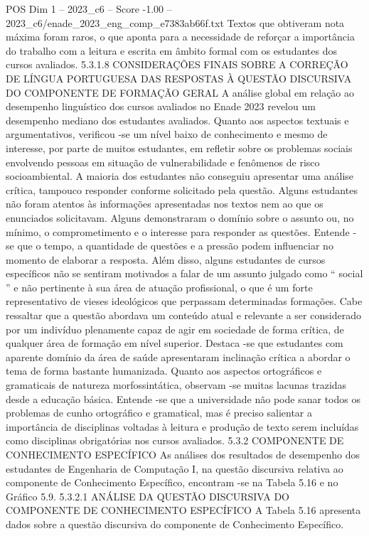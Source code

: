 \begin{textsample}{POS Dim 1 – 2023\_c6 – Score -1.00 – 2023\_c6/enade\_2023\_eng\_comp\_e7383ab66f.txt}
Textos que obtiveram nota máxima foram raros, o que aponta para a necessidade de reforçar a importância do trabalho com a leitura e escrita em âmbito formal com os estudantes dos cursos avaliados. 5.3.1.8 CONSIDERAÇÕES FINAIS SOBRE A CORREÇÃO DE LÍNGUA PORTUGUESA DAS RESPOSTAS À QUESTÃO DISCURSIVA DO COMPONENTE DE FORMAÇÃO GERAL A análise global em relação ao desempenho linguístico dos cursos avaliados no Enade 2023 revelou um desempenho mediano dos estudantes avaliados.
Quanto aos aspectos textuais e argumentativos, verificou -se um nível baixo de conhecimento e mesmo de interesse, por parte de muitos estudantes, em refletir sobre os problemas sociais envolvendo pessoas em situação de vulnerabilidade e fenômenos de risco socioambiental.
A maioria dos estudantes não conseguiu apresentar uma análise crítica, tampouco responder conforme solicitado pela questão.
Alguns estudantes não foram atentos às informações apresentadas nos textos nem ao que os enunciados solicitavam.
Alguns demonstraram o domínio sobre o assunto ou, no mínimo, o comprometimento e o interesse para responder as questões.
Entende -se que o tempo, a quantidade de questões e a pressão podem influenciar no momento de elaborar a resposta.
Além disso, alguns estudantes de cursos específicos não se sentiram motivados a falar de um assunto julgado como “ social ” e não pertinente à sua área de atuação profissional, o que é um forte representativo de vieses ideológicos que perpassam determinadas formações.
Cabe ressaltar que a questão abordava um conteúdo atual e relevante a ser considerado por um indivíduo plenamente capaz de agir em sociedade de forma crítica, de qualquer área de formação em nível superior.
Destaca -se que estudantes com aparente domínio da área de saúde apresentaram inclinação crítica a abordar o tema de forma bastante humanizada.
Quanto aos aspectos ortográficos e gramaticais de natureza morfossintática, observam -se muitas lacunas trazidas desde a educação básica.
Entende -se que a universidade não pode sanar todos os problemas de cunho ortográfico e gramatical, mas é preciso salientar a importância de disciplinas voltadas à leitura e produção de texto serem incluídas como disciplinas obrigatórias nos cursos avaliados. 5.3.2 COMPONENTE DE CONHECIMENTO ESPECÍFICO As análises dos resultados de desempenho dos estudantes de Engenharia de Computação I, na questão discursiva relativa ao componente de Conhecimento Específico, encontram -se na Tabela 5.16 e no Gráfico 5.9. 5.3.2.1 ANÁLISE DA QUESTÃO DISCURSIVA DO COMPONENTE DE CONHECIMENTO ESPECÍFICO A Tabela 5.16 apresenta dados sobre a questão discursiva do componente de Conhecimento Específico.

\end{textsample}

